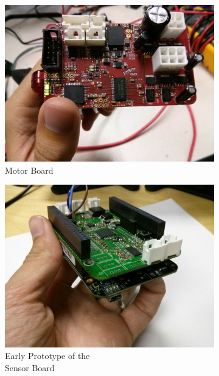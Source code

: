 \begin{figure}[thpb]
\begin{subfigure}{.3\textwidth}
      \centering
      \includegraphics[width=\columnwidth]{tex/img/motor_board}
      \caption{Motor Board}
      \label{fig:motor_board}
\end{subfigure}
\begin{subfigure}{.3\textwidth}
      \centering
      \includegraphics[width=\columnwidth]{tex/img/sensor_board}
      \caption{Early Prototype of the \\Sensor Board}
      \label{fig:sensor_board}
\end{subfigure}
\begin{subfigure}{.3\textwidth}

\end{subfigure}
\end{figure}
